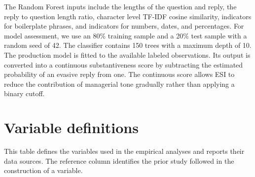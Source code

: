 \documentclass[12pt]{article}
\begin{document}
The Random Forest inputs include the lengths of the question and reply, the reply to question length ratio, character level TF-IDF cosine similarity, indicators for boilerplate phrases, and indicators for numbers, dates, and percentages. For model assessment, we use an 80\% training sample and a 20\% test sample with a random seed of 42. The classifier contains 150 trees with a maximum depth of 10. The production model is fitted to the available labeled observations. Its output is converted into a continuous substantiveness score by subtracting the estimated probability of an evasive reply from one. The continuous score allows ESI to reduce the contribution of managerial tone gradually rather than applying a binary cutoff.

\clearpage
\setcounter{table}{0}
\renewcommand{\thetable}{C\arabic{table}}
\renewcommand{\theHtable}{C\arabic{table}}
\section{Variable definitions} \label{app:variable_definitions}

This table defines the variables used in the empirical analyses and reports their data sources. The reference column identifies the prior study followed in the construction of a variable.
\end{document}
